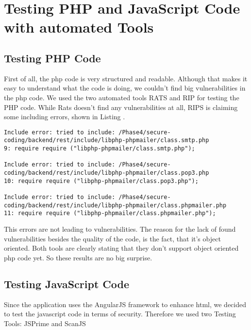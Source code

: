 \chapter{Testing PHP and JavaScript Code with automated Tools}

\section{Testing PHP Code}

First of all, the php code is very structured and readable. Although that makes it easy to understand what the code is doing, we couldn't find big vulnerabilities in the php code.
We used  the two automated tools RATS and RIP for testing the PHP code. While Rats doesn't find any vulnerabilities at all, RIPS is claiming some including errors, shown in Listing .
\begin{lstlisting}[caption= Output of automated testing tool RIPS]
Include error: tried to include: /Phase4/secure-coding/backend/rest/include/libphp-phpmailer/class.smtp.php
9: require require ("libphp-phpmailer/class.smtp.php"); 

Include error: tried to include: /Phase4/secure-coding/backend/rest/include/libphp-phpmailer/class.pop3.php
10: require require ("libphp-phpmailer/class.pop3.php"); 

Include error: tried to include: /Phase4/secure-coding/backend/rest/include/libphp-phpmailer/class.phpmailer.php
11: require require ("libphp-phpmailer/class.phpmailer.php"); 
\end{lstlisting}
This errors are not leading to vulnerabilities. The reason for the lack of found vulnerabilities besides the quality of the code, is the fact, that it's object oriented. Both tools are clearly stating that they don't support object oriented php code yet. So these results are no big surprise.

\section{Testing JavaScript Code}
Since the application uses  the AngularJS framework to enhance html, we decided to test the javascript code in terms of security. Therefore we used two Testing Tools: JSPrime and ScanJS




 